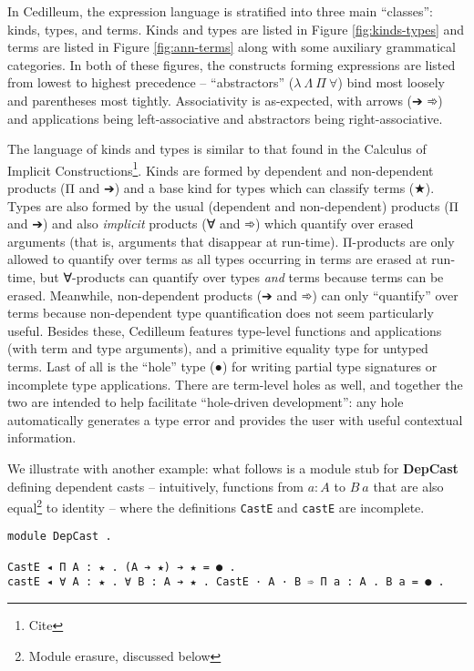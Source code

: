 \documentclass{article}
\begin{document}
In Cedilleum, the expression language is stratified into three main ``classes'':
kinds, types, and terms. Kinds and types are listed in Figure
\ref{fig:kinds-types} and terms are listed in Figure \ref{fig:ann-terms} along
with some auxiliary grammatical categories. In both of these figures, the
constructs forming expressions are listed from lowest to highest precedence --
``abstractors'' ($\lambda\ \Lambda\ \Pi\ \forall$) bind most loosely and
parentheses most tightly. Associativity is as-expected, with arrows (➔ ➾) and
applications being left-associative and abstractors being right-associative.

The language of kinds and types is similar to that found in the Calculus of
Implicit Constructions\footnote{Cite}. Kinds are formed by dependent and
non-dependent products (Π and ➔) and a base kind for types which can classify
terms (★). Types are also formed by the usual (dependent and non-dependent)
products (Π and ➔) and also \textit{implicit} products (∀ and ➾) which quantify
over erased arguments (that is, arguments that disappear at run-time).
Π-products are only allowed to quantify over terms as all types occurring in
terms are erased at run-time, but ∀-products can quantify over types
\textit{and} terms because terms can be erased. Meanwhile, non-dependent
products (➔ and ➾) can only ``quantify'' over terms because non-dependent type
quantification does not seem particularly useful. Besides these, Cedilleum
features type-level functions and applications (with term and type arguments),
and a primitive equality type for untyped terms. Last of all is the ``hole''
type (●) for writing partial type signatures or incomplete type applications.
There are term-level holes as well, and together the two are intended to help
facilitate ``hole-driven development'': any hole automatically generates a type
error and provides the user with useful contextual information.

We illustrate with another example: what follows is a module stub for
\textbf{DepCast} defining dependent casts -- intuitively, functions from $a : A$
to $B\ a$ that are also equal\footnote{Module erasure, discussed below} to
identity -- where the definitions \texttt{CastE} and \texttt{castE} are
incomplete.

\begin{verbatim}
module DepCast .

CastE ◂ Π A : ★ . (A ➔ ★) ➔ ★ = ● .
castE ◂ ∀ A : ★ . ∀ B : A ➔ ★ . CastE · A · B ➾ Π a : A . B a = ● .
\end{verbatim}
  
\end{document}
